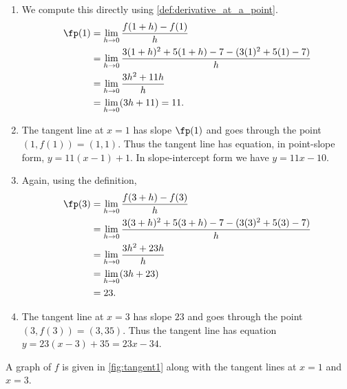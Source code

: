 {	\begin{enumerate}
	\item We compute this directly using \autoref{def:derivative_at_a_point}.
		\begin{align*}
			\fp(1) &= \lim_{h\to 0} \frac{f(1+h)-f(1)}{h} \\
				   &= \lim_{h\to 0} \frac{3(1+h)^2+5(1+h)-7 - (3(1)^2+5(1)-7)}{h}\\
				   &= \lim_{h\to 0} \frac{3h^2+11h}{h}\\
				   &= \lim_{h\to 0}(3h+11)=11.%
		\end{align*}
	\item The tangent line at $x=1$ has slope $\fp(1)$ and goes through the point $(1,f(1)) = (1,1)$. Thus the tangent line has equation, in point-slope form, $y = 11(x-1) + 1$. In slope-intercept form we have $y = 11x-10$.
	\item Again, using the definition,
		\begin{align*}
			\fp(3) &= \lim_{h\to 0} \frac{f(3+h)-f(3)}{h} \\
				   &= \lim_{h\to 0} \frac{3(3+h)^2+5(3+h)-7 - (3(3)^2+5(3)-7)}{h} \\
				   &= \lim_{h\to 0} \frac{3h^2+23h}{h}\\
				   &= \lim_{h\to 0}(3h+23)\\
				   &= 23.
		\end{align*}
	\item The tangent line at $x=3$ has slope $23$ and goes through the point $(3,f(3)) = (3,35)$. Thus the tangent line has equation $y=23(x-3)+35 = 23x-34$.
	\end{enumerate}


A graph of $f$ is given in \autoref{fig:tangent1} along with the tangent lines at $x=1$ and $x=3$.}

